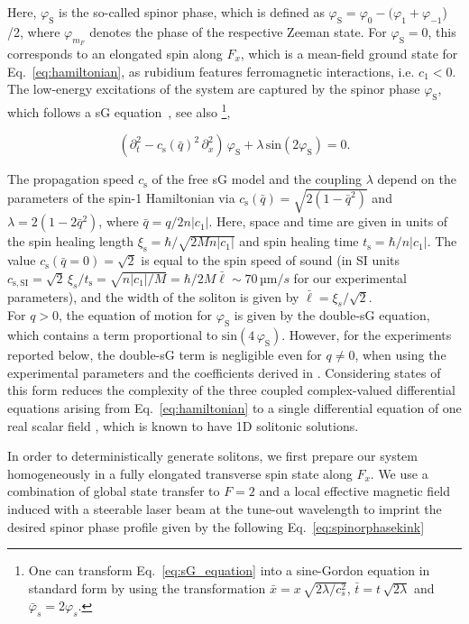 \documentclass[aps,

               pra,
               twocolumn,
               amsmath,
               amssymb,
               superscriptaddress,
               reprint,
               10pt
              ]{revtex4-2}
\newcommand{\phis}{\varphi_\mathrm{S}}
\begin{document}
Here, $\phis$ is the so-called spinor phase, which is defined as $\phis = \varphi_0 - (\varphi_1 + \varphi_{-1}$) /2, where $\varphi_{m_F}$ denotes the phase of the respective Zeeman state. For $\phis=0$, this corresponds to an elongated spin along $F_x$, which is a mean-field ground state for Eq.~\eqref{eq:hamiltonian}, as rubidium features ferromagnetic interactions, i.e. $c_1 < 0$. The low-energy excitations of the system are captured by the spinor phase $\phis$, which follows a sG equation~\cite{Siovitz2025}, see also \footnote{One can transform Eq.~\eqref{eq:sG_equation} into a sine-Gordon equation in standard form by using the transformation $\bar{x} = x \, \sqrt{2 \lambda / c_s^2}$, $\bar{t} = t \, \sqrt{2 \lambda}$ and $\bar{\varphi}_s = 2 \varphi_s$.},

\begin{equation}\label{eq:sG_equation}
    (\partial_t^2 - c_\mathrm{s}(\bar{q})^2 \, \partial_x^2 ) \, \phis
    + \lambda \, \mathrm{sin} (2 \phis) = 0.
\end{equation}

The propagation speed $c_\mathrm{s}$ of the free sG model and the coupling $\lambda$ depend on the parameters of the spin-1 Hamiltonian via $c_\mathrm{s}(\bar{q}) = \sqrt{2(1-\bar{q}^2)}$ and $\lambda = 2(1-2\bar{q}^2)$, where $\bar{q} = q / 2 n |c_1|$.
Here, space and time are given in units of the spin healing length $\xi_\mathrm{s} = \hbar/\sqrt{2 M n |c_1|}$ and spin healing time $t_\mathrm{s} = \hbar / n |c_1|$.
The value $c_\mathrm{s}(\bar{q}=0)=\sqrt{2}$ is equal to the spin speed of sound (in SI units $c_{\mathrm{s}, \mathrm{SI}} = \sqrt{2} \, \xi_s/t_\mathrm{s}  =\sqrt{n |c_1|/M} = \hbar / 2 M \bar{\ell} \sim 70\,\text{µm}/s$ for our experimental parameters), and the width of the soliton is given by $\bar{\ell} = \xi_s/\sqrt{2}$. \\
For $q>0$, the equation of motion for $\phis$ is given by the double-sG equation, which contains a term proportional to $\mathrm{sin}(4 \,\phis)$. However, for the experiments reported below, the double-sG term is negligible even for $q \neq 0$, when using the experimental parameters and the coefficients derived in \cite{Siovitz2025}.
Considering states of this form reduces the complexity of the three coupled complex-valued  differential equations arising from Eq.~\eqref{eq:hamiltonian} to a single differential equation of one real scalar field \cite{Rutkevich2024}, which is known to have 1D solitonic solutions.

In order to deterministically generate solitons, we first prepare our system homogeneously in a fully elongated transverse spin state along $F_x$.
We use a combination of global state transfer to $F=2$ and a local effective magnetic field \cite{Lin2009} induced with a steerable laser beam at the tune-out wavelength \cite{Schmidt_2016} to imprint the desired spinor phase profile given by the following Eq.~\eqref{eq:spinorphasekink}
\end{document}
